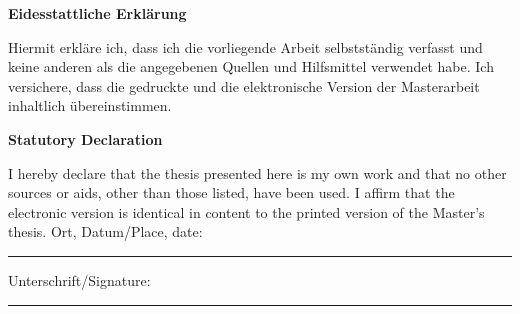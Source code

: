 \addchap*{}
\begin{center}
    \bfseries \Large
    Eidesstattliche Erklärung
\end{center}
    Hiermit erkläre ich,
    dass ich die vorliegende Arbeit selbstständig verfasst und keine anderen als die angegebenen Quellen und Hilfsmittel verwendet habe.
    Ich versichere,
    dass die gedruckte und die elektronische Version der Masterarbeit inhaltlich übereinstimmen.
\begin{center}
    \bfseries \Large
    Statutory Declaration
\end{center}
I hereby declare that
the thesis presented here is my own work and that no other sources or aids, other than those listed, have been used.
I affirm that the electronic version is identical in content to the printed version of the Master's thesis.
  \vfill
  \vfill
  Ort, Datum/Place, date:\\
  \rule[1em]{25em}{0.5pt}  %

  Unterschrift/Signature:\\
  \rule[1em]{25em}{0.5pt}  %
